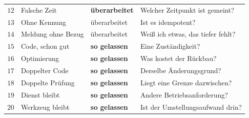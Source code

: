 \begin{merksatz}
\begin{center}
{\begin{tabular}{@{}P{0.7cm}P{3.4cm}P{2.1cm}P{2.4cm}@{}}
$12$ & Falsche Zeit & \textcolor{tief}{\textbf{überarbeitet}} & Welcher Zeitpunkt ist gemeint?\\
$13$ & Ohne Kennung & \textcolor{tief}{überarbeitet} & Ist es idempotent?\\
$14$ & Meldung ohne Bezug & \textcolor{tief}{überarbeitet} & Weiß ich etwas, das tiefer fehlt?\\
\midrule
$15$ & Code, schon gut & \textcolor{grau}{\textbf{so gelassen}} & Eine Zuständigkeit?\\
$16$ & Optimierung & \textcolor{grau}{\textbf{so gelassen}} & Was kostet der Rückbau?\\
$17$ & Doppelter Code & \textcolor{grau}{\textbf{so gelassen}} & Derselbe Änderungsgrund?\\
$18$ & Doppelte Prüfung & \textcolor{grau}{\textbf{so gelassen}} & Liegt eine Grenze dazwischen?\\
$19$ & Dienst bleibt & \textcolor{grau}{\textbf{so gelassen}} & Andere Betriebsanforderung?\\
$20$ & Werkzeug bleibt & \textcolor{grau}{\textbf{so gelassen}} & Ist der Umstellungsaufwand drin?\\
\bottomrule
\end{tabular}}
\end{center}

\begin{center}
\begin{minipage}{0.88\textwidth}
\end{minipage}
\end{center}
\end{merksatz}

